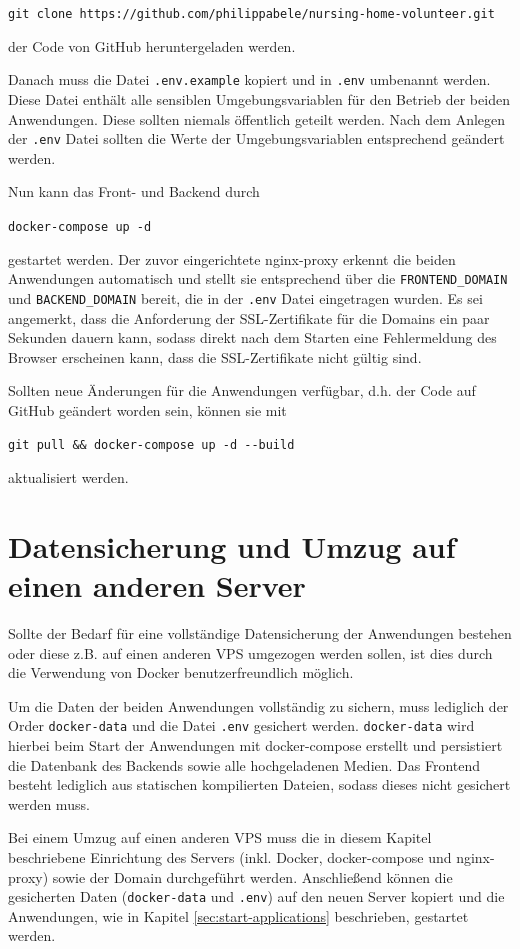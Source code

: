 \begin{center}
  \lstinline{git clone https://github.com/philippabele/nursing-home-volunteer.git}
\end{center}

der Code von GitHub heruntergeladen werden.

Danach muss die Datei \lstinline{.env.example} kopiert und in \lstinline{.env} umbenannt werden. Diese Datei enthält alle sensiblen Umgebungsvariablen für den Betrieb der beiden Anwendungen. Diese sollten niemals öffentlich geteilt werden. Nach dem Anlegen der \lstinline{.env} Datei sollten die Werte der Umgebungsvariablen entsprechend geändert werden.

Nun kann das Front- und Backend durch

\begin{center}
  \lstinline{docker-compose up -d}
\end{center}

gestartet werden. Der zuvor eingerichtete nginx-proxy erkennt die beiden Anwendungen automatisch und stellt sie entsprechend über die \lstinline{FRONTEND_DOMAIN} und \lstinline{BACKEND_DOMAIN} bereit, die in der \lstinline{.env} Datei eingetragen wurden. Es sei angemerkt, dass die Anforderung der SSL-Zertifikate für die Domains ein paar Sekunden dauern kann, sodass direkt nach dem Starten eine Fehlermeldung des Browser erscheinen kann, dass die SSL-Zertifikate nicht gültig sind.

Sollten neue Änderungen für die Anwendungen verfügbar, d.h. der Code auf GitHub geändert worden sein, können sie mit

\begin{center}
  \lstinline{git pull && docker-compose up -d --build}
\end{center}

aktualisiert werden.

\section{Datensicherung und Umzug auf einen anderen Server}
Sollte der Bedarf für eine vollständige Datensicherung der Anwendungen bestehen oder diese z.B. auf einen anderen \ac{VPS} umgezogen werden sollen, ist dies durch die Verwendung von Docker benutzerfreundlich möglich.

Um die Daten der beiden Anwendungen vollständig zu sichern, muss lediglich der Order \lstinline{docker-data} und die Datei \lstinline{.env} gesichert werden. \lstinline{docker-data} wird hierbei beim Start der Anwendungen mit docker-compose erstellt und persistiert die Datenbank des Backends sowie alle hochgeladenen Medien. Das Frontend besteht lediglich aus statischen kompilierten Dateien, sodass dieses nicht gesichert werden muss.

Bei einem Umzug auf einen anderen \ac{VPS} muss die in diesem Kapitel beschriebene Einrichtung des Servers (inkl. Docker, docker-compose und nginx-proxy) sowie der Domain durchgeführt werden. Anschließend können die gesicherten Daten (\lstinline{docker-data} und \lstinline{.env}) auf den neuen Server kopiert und die Anwendungen, wie in Kapitel \ref{sec:start-applications} beschrieben, gestartet werden.
